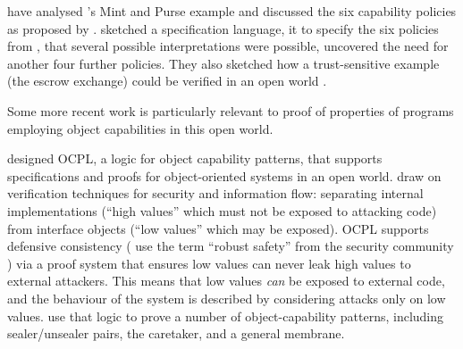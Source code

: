 \citet{capeFTfJP,capeFTfJP14} have
analysed \citet{MillerPhD}'s Mint and Purse example 
and discussed the six
capability policies 
as proposed by \citet{MillerPhD}.
\citet{WAS-OOPSLA14-TR} %
sketched a  specification language,    it to  
specify the six policies from \cite{MillerPhD}, %
 that several possible interpretations were possible, %
 uncovered
the need for another four further policies.
They also
  sketched how 
a trust-sensitive 
example (the escrow exchange) could be verified in an open world
\cite{swapsies}. 

 
Some more recent work is particularly relevant to proof of properties
of programs employing object capabilities in this open world.


\citet{ddd}  designed OCPL, a logic
for object capability patterns, that supports specifications and
proofs for object-oriented systems in an open world.  
draw on verification techniques for security and
information flow: separating internal implementations (``high values''
which must not be exposed to attacking code) from interface objects
(``low values'' which may be exposed).  OCPL supports defensive
consistency %
( use the term ``robust safety'' from the
security community \cite{Bengtson}) via a proof system that ensures
low values can never leak high values to external attackers. 
This means that low values \textit{can} be exposed to external code,
and the behaviour of the system is described by considering attacks only
on low values.  %
 use that logic to
prove a number of object-capability patterns, including
sealer/unsealer pairs, the caretaker, and a general membrane.

